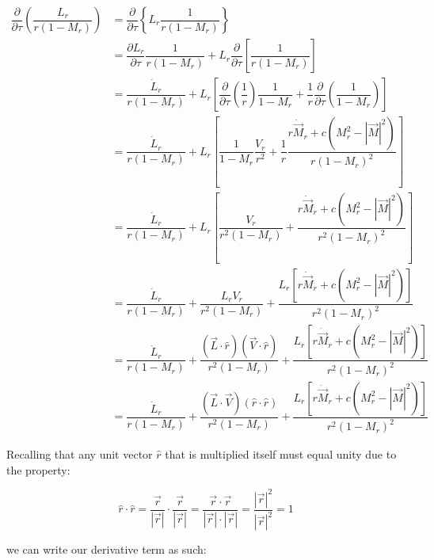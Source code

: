\documentclass[]{aiaa-tc}%
\begin{document}
\begin{align*}
\dfrac{\partial}{\partial \tau} \left( \dfrac{L_r}{r (1 - M_r)}  \right)
& = \dfrac{\partial}{\partial \tau} \left\{ L_r \dfrac{1}{r (1 - M_r)}  \right\} \\
& = \dfrac{\partial L_r}{\partial \tau} \dfrac{1}{r (1 - M_r)}
    + L_r\dfrac{\partial}{\partial \tau} \left[ \dfrac{1}{r (1 - M_r)} \right] \\
& = \dfrac{\dot{L}_r}{r (1 - M_r)}
    + L_r \left[
    \dfrac{\partial}{\partial\tau} \left(\dfrac{1}{r}\right) \dfrac{1}{1 - M_r}
    + \dfrac{1}{r} \dfrac{\partial}{\partial\tau} \left(\dfrac{1}{1-M_r}\right)
    \right] \\
& = \dfrac{\dot{L}_r}{r (1 - M_r)}
    + L_r \left[
    \dfrac{1}{1 - M_r} \dfrac{V_r}{r^2}
    + \dfrac{1}{r}
    \dfrac{ r\dot{\vec{M}}_r + c \left( M_r^2 - |\vec{M}|^2 \right) }
    {r (1 - M_r)^2}
    \right] \\
& = \dfrac{\dot{L}_r}{r (1 - M_r)}
    + L_r \left[
    \dfrac{V_r}{r^2 (1 - M_r)}
    + \dfrac{ r\dot{\vec{M}}_r + c \left( M_r^2 - |\vec{M}|^2 \right) }
        {r^2 (1 - M_r)^2}
    \right] \\
&= \dfrac{\dot{L}_r}{r (1 - M_r)}
    + \dfrac{L_r V_r}{r^2 (1 - M_r)}
    + \dfrac{ L_r \left[
        r\dot{\vec{M}}_r + c \left( M_r^2 - |\vec{M}|^2 \right) \right] }
        {r^2 (1 - M_r)^2} \\
&= \dfrac{\dot{L}_r}{r (1 - M_r)}
    + \dfrac{(\vec{L}\cdot\hat{r}) (\vec{V}\cdot\hat{r})}{r^2 (1 - M_r)}
    + \dfrac{ L_r \left[
        r\dot{\vec{M}}_r + c \left( M_r^2 - |\vec{M}|^2 \right) \right] }
        {r^2 (1 - M_r)^2} \\
&= \dfrac{\dot{L}_r}{r (1 - M_r)}
    + \dfrac{(\vec{L}\cdot\vec{V}) (\hat{r}\cdot\hat{r})}{r^2 (1 - M_r)}
    + \dfrac{ L_r \left[
        r\dot{\vec{M}}_r + c \left( M_r^2 - |\vec{M}|^2 \right) \right] }
        {r^2 (1 - M_r)^2}
\end{align*}

\noindent Recalling that any unit vector $\hat{r}$ that is multiplied itself must equal unity due to the property:

\begin{equation} \label{UnitSquared}
\hat{r}\cdot\hat{r}
= \dfrac{\vec{r}}{|\vec{r}|}\cdot\dfrac{\vec{r}}{|\vec{r}|}
= \dfrac{\vec{r}\cdot\vec{r}}{|\vec{r}|\cdot|\vec{r}|}
= \dfrac{|\vec{r}|^2}{|\vec{r}|^2} = 1
\end{equation}

\noindent we can write our derivative term as such:
\end{document}
